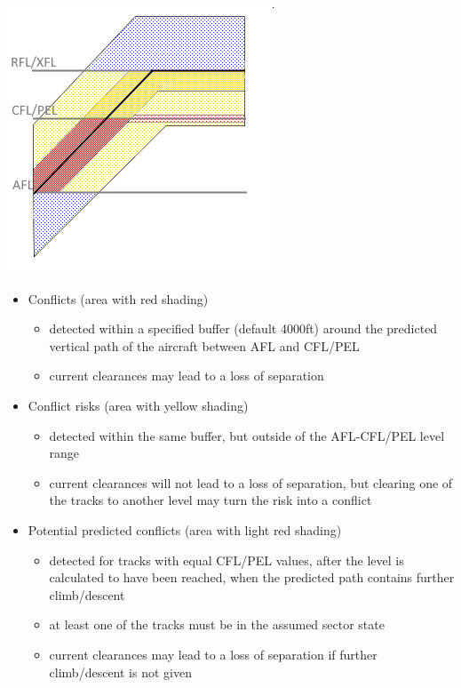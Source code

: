 \documentclass[11pt,a4paper]{memoir}
\begin{document}
\includegraphics{img/mtcdv.png}

\begin{itemize}
    \item Conflicts (area with red shading)
    \begin{itemize}
        \item detected within a specified buffer (default 4000ft) around the predicted vertical path of the aircraft between AFL and CFL/PEL
        \item current clearances may lead to a loss of separation
    \end{itemize}
    \item Conflict risks (area with yellow shading)
    \begin{itemize}
        \item detected within the same buffer, but outside of the AFL-CFL/PEL level range
        \item current clearances will not lead to a loss of separation, but clearing one of the tracks to another level may turn the risk into a conflict
    \end{itemize}
    \item Potential predicted conflicts (area with light red shading)
    \begin{itemize}
        \item detected for tracks with equal CFL/PEL values, after the level is calculated to have been reached, when the predicted path contains further climb/descent
        \item at least one of the tracks must be in the assumed sector state
        \item current clearances may lead to a loss of separation if further climb/descent is not given
    \end{itemize}

\end{itemize}
\end{document}

